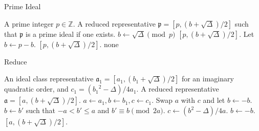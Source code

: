 \documentclass{ucalgthes1}
\theoremstyle{plain}
\theoremstyle{definition}
\newcommand{\ZZ}{\mathbb{Z}}
\begin{document}
\bigbreak
\bigbreak


\begin{comment}
\begin{algorithm}[h]
\caption{Identity}
\label{alg:identity}
\begin{algorithmic}[1]
\ENSURE A reduced representative for the class of principal ideals.
\IF {$\Delta \equiv 1 \pmod 4$}
	\STATE Let $b = 1$.
\ELSE
	\STATE Let $b = 0$.
\ENDIF
\RETURN $[1, (b+\sqrt\Delta)/2]$.
\end{algorithmic}
\end{algorithm}
\end{comment}

\begin{comment}
\begin{algorithm}[h]
\caption{Iverse}
\label{alg:inverse}
\begin{algorithmic}[1]
\REQUIRE A reduced representative $\mathfrak a = [a, (b+\sqrt\Delta)/2]$.
\ENSURE A reduced representative $\mathfrak a^{-1}$ such that $\mathfrak a \mathfrak a^{-1}$ is principal.
\RETURN $[a, (-b+\sqrt\Delta)/2]$.
\end{algorithmic}
\end{algorithm}
\end{comment}


\begin{algorithm}[h]
\caption{Prime Ideal}
\label{alg:prime}
\begin{algorithmic}[1]
\REQUIRE A prime integer $p \in \ZZ$.
\ENSURE A reduced representative $\mathfrak p = [p, (b+\sqrt\Delta)/2]$ such that $\mathfrak p$ is a prime ideal if one exists.
\STATE $b \gets \sqrt\Delta \pmod p$
	\RETURN $[p, (b+\sqrt\Delta)/2]$.	
\ENDIF
\STATE Let $b \gets p-b$.
	\RETURN $[p, (b+\sqrt\Delta)/2]$.	
\ENDIF
\RETURN none
\end{algorithmic}
\end{algorithm}


\begin{algorithm}[h]
\caption{Reduce}
\label{alg:reduce}
\begin{algorithmic}[1]
\REQUIRE An ideal class representative $\mathfrak a_1 = [a_1, (b_1+\sqrt\Delta)/2]$ for an imaginary quadratic order, and $c_1 = ({b_1}^2 - \Delta)/4a_1$.
\ENSURE A reduced representative $\mathfrak a = [a, (b+\sqrt\Delta)/2]$.
\STATE $a \gets a_1, b \gets b_1, c \gets c_1$.
		\STATE Swap $a$ with $c$ and let $b \gets -b$.
	\ENDIF
		\STATE $b \gets b'$ such that $-a < b' \le a$ and $b' \equiv b \pmod{2a}$.
		\STATE $c \gets (b^2-\Delta)/4a$.
	\ENDIF
\ENDWHILE
{}
	\STATE $b \gets -b$.
\ENDIF
\RETURN $[a, (b+\sqrt\Delta)/2]$.
\end{algorithmic}
\end{algorithm}
\end{document}
